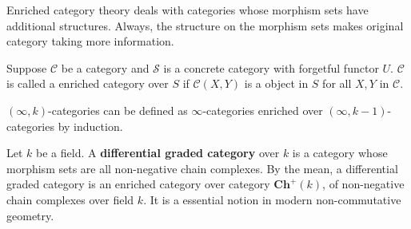 Enriched category theory deals with categories whose morphism sets have additional structures. Always, the structure on the morphism sets makes original category taking more information.
\begin{mydefn}
Suppose $\mathcal{C}$ be a category and $\mathcal{S}$ is a concrete category with forgetful functor $U$.  $\mathcal{C}$ is called a enriched category over $S$ if $\mathcal{C}(X,Y)$ is a object in $S$ for all $X,Y$ in $\mathcal{C}$.
\end{mydefn}
\begin{ex}
$(\infty, k)$-categories can be defined as $\infty$-categories enriched over $(\infty, k-1)$-categories by induction.
\end{ex}
\begin{ex}
Let $k$ be a field. A \textbf{differential graded category} over $k$ is a category whose morphism sets are all non-negative chain complexes. By the mean, a differential graded category is an enriched category over category $\mathbf{Ch}^{+}(k)$, of non-negative chain complexes over field $k$. It is a essential notion in modern non-commutative geometry.
\end{ex}


